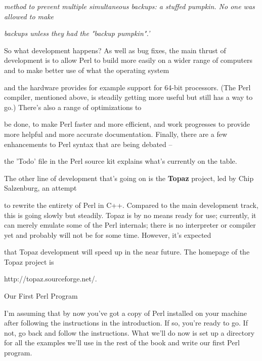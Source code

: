 \documentclass[a4paper,11pt]{book}
\begin{document}
\noindent \textit{method to prevent multiple simultaneous backups: a stuffed pumpkin. No one was allowed to make}

\noindent \textit{backups unless they had the "backup pumpkin".'}

\noindent 

\noindent So what development happens? As well as bug fixes, the main thrust of development is to allow Perl to build more easily on a wider range of computers and to make better use of what the operating system

\noindent and the hardware provides for example support for 64-bit processors. (The Perl compiler, mentioned above, is steadily getting more useful but still has a way to go.) There's also a range of optimizations to

\noindent be done, to make Perl faster and more efficient, and work progresses to provide more helpful and more accurate documentation. Finally, there are a few enhancements to Perl syntax that are being debated --

\noindent the 'Todo' file in the Perl source kit explains what's currently on the table.

\noindent 

\noindent The other line of development that's going on is the \textbf{Topaz }project, led by Chip Salzenburg, an attempt

\noindent to rewrite the entirety of Perl in C++. Compared to the main development track, this is going slowly but steadily. Topaz is by no means ready for use; currently, it can merely emulate some of the Perl internals; there is no interpreter or compiler yet and probably will not be for some time. However, it's expected

\noindent that Topaz development will speed up in the near future. The homepage of the Topaz project is

\noindent http://topaz.sourceforge.net/.

\noindent 

\noindent 

\noindent Our First Perl Program

\noindent 

\noindent I'm assuming that by now you've got a copy of Perl installed on your machine after following the instructions in the introduction. If so, you're ready to go. If not, go back and follow the instructions. What we'll do now is set up a directory for all the examples we'll use in the rest of the book and write our first Perl program.
\end{document}
